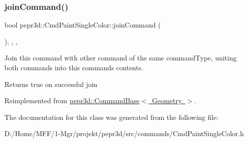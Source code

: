 \subsubsection{\texorpdfstring{joinCommand()}{joinCommand()}}
{\footnotesize\ttfamily bool pepr3d\+::\+Cmd\+Paint\+Single\+Color\+::join\+Command (\begin{DoxyParamCaption}\item[{const \mbox{\hyperlink{classpepr3d_1_1_command_base}{Command\+Base}} \&}]{ }\end{DoxyParamCaption})\hspace{0.3cm}{\ttfamily [inline]}, {\ttfamily [override]}, {\ttfamily [protected]}, {\ttfamily [virtual]}}



Join this command with other command of the same command\+Type, uniting both commands into this command\textquotesingle{}s contents. 

\begin{DoxyReturn}{Returns}
true on successful join 
\end{DoxyReturn}


Reimplemented from \mbox{\hyperlink{classpepr3d_1_1_command_base_a9ef408154b7cb446e626e049f268abb4}{pepr3d\+::\+Command\+Base$<$ Geometry $>$}}.



The documentation for this class was generated from the following file\+:\begin{DoxyCompactItemize}
\item 
D\+:/\+Home/\+M\+F\+F/1-\/\+Mgr/projekt/pepr3d/src/commands/Cmd\+Paint\+Single\+Color.\+h\end{DoxyCompactItemize}
